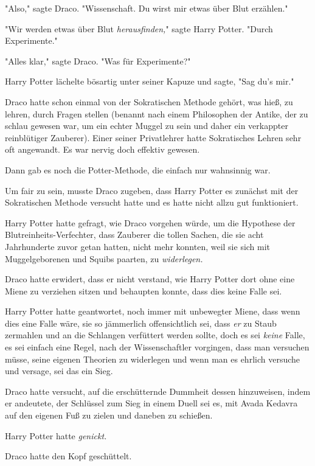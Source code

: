 {"Also," sagte Draco. "Wissenschaft. Du wirst mir etwas über Blut erzählen."

"Wir werden etwas über Blut \emph{herausfinden,}" sagte Harry Potter. "Durch Experimente."

"Alles klar," sagte Draco. "Was für Experimente?"

Harry Potter lächelte bösartig unter seiner Kapuze und sagte, "Sag du's mir."

\later

Draco hatte schon einmal von der Sokratischen Methode gehört, was hieß, zu lehren, durch Fragen stellen (benannt nach einem Philosophen der Antike, der zu schlau gewesen war, um ein echter Muggel zu sein und daher ein verkappter reinblütiger Zauberer). Einer seiner Privatlehrer hatte Sokratisches Lehren sehr oft angewandt. Es war nervig doch effektiv gewesen.

Dann gab es noch die Potter-Methode, die einfach nur wahnsinnig war.

Um fair zu sein, musste Draco zugeben, dass Harry Potter es zunächst mit der Sokratischen Methode versucht hatte und es hatte nicht allzu gut funktioniert.

Harry Potter hatte gefragt, wie Draco vorgehen würde, um die Hypothese der Blutreinheits-Verfechter, dass Zauberer die tollen Sachen, die sie acht Jahrhunderte zuvor getan hatten, nicht mehr konnten, weil sie sich mit Muggelgeborenen und Squibs paarten, zu \emph{widerlegen.}

Draco hatte erwidert, dass er nicht verstand, wie Harry Potter dort ohne eine Miene zu verziehen sitzen und behaupten konnte, dass dies keine Falle sei.

Harry Potter hatte geantwortet, noch immer mit unbewegter Miene, dass wenn dies eine Falle wäre, sie so jämmerlich offensichtlich sei, dass \emph{er} zu Staub zermahlen und an die Schlangen verfüttert werden sollte, doch es sei \emph{keine} Falle, es sei einfach eine Regel, nach der Wissenschaftler vorgingen, dass man versuchen müsse, seine eigenen Theorien zu widerlegen und wenn man es ehrlich versuche und versage, sei das ein Sieg.

Draco hatte versucht, auf die erschütternde Dummheit dessen hinzuweisen, indem er andeutete, der Schlüssel zum Sieg in einem Duell sei es, mit Avada Kedavra auf den eigenen Fuß zu zielen und daneben zu schießen.

Harry Potter hatte \emph{genickt.}

Draco hatte den Kopf geschüttelt.

}
